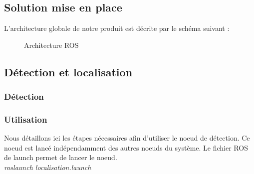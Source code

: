 \documentclass[10pt,a4paper]{article}
\begin{document}
\subsection{Solution mise en place}
\label{sec:solution_mise_en_place}

L'architecture globale de notre produit est décrite par le schéma suivant :

\begin{figure}[h]
\center
\caption{Architecture ROS}	
\end{figure}


\subsection{Détection et localisation}
\label{sec:detection_et_localisation}




\subsubsection{Détection}
\label{sec:detection}

\subsubsection*{Utilisation}

Nous détaillons ici les étapes nécessaires afin d'utiliser le noeud de détection. Ce noeud est lancé indépendamment des autres noeuds du système. 
Le fichier ROS de launch permet de lancer le noeud.\\
\textit{roslaunch localisation.launch}\\
\end{document}
